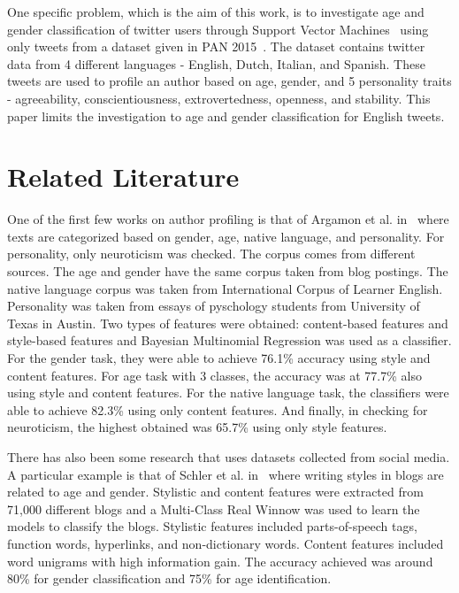 \documentclass[a4paper]{llncs}
\begin{document}
One specific problem, which is the aim of this work, is to investigate age and gender classification of twitter users through Support Vector Machines~\cite{cortes1995support} using only tweets from a dataset given in PAN 2015~\cite{rangel:2015}. The dataset contains twitter data from 4 different languages - English, Dutch, Italian, and Spanish. These tweets are used to profile an author based on age, gender, and 5 personality traits - agreeability, conscientiousness, extrovertedness, openness, and stability. This paper limits the investigation to age and gender classification for English tweets.   



\section{Related Literature}
One of the first few works on author profiling is that of Argamon et al. in~\cite{argamon2009automatically} where texts are categorized based on gender, age, native language, and personality. For personality, only neuroticism was checked. The corpus comes from different sources. The age and gender have the same corpus taken from blog postings. The native language corpus was taken from International Corpus of Learner English. Personality was taken from essays of pyschology students from University of Texas in Austin. Two types of features were obtained: content-based features and style-based features and Bayesian Multinomial Regression was used as a classifier. For the gender task, they were able to achieve 76.1\% accuracy using style and content features. For age task with 3 classes, the accuracy was at 77.7\% also using style and content features. For the native language task, the classifiers were able to achieve 82.3\% using only content features. And finally, in checking for neuroticism, the highest obtained was 65.7\% using only style features. 

There has also been some research that uses datasets collected from social media. A particular example is that of Schler et al. in~\cite{schler2006effects} where writing styles in blogs are related to age and gender. Stylistic and content features were extracted from 71,000 different blogs and a Multi-Class Real Winnow was used to learn the models to classify the blogs. Stylistic features included parts-of-speech tags, function words, hyperlinks, and non-dictionary words. Content features included word unigrams with high information gain. The accuracy achieved was around 80\% for gender classification and 75\% for age identification.  
\end{document}
